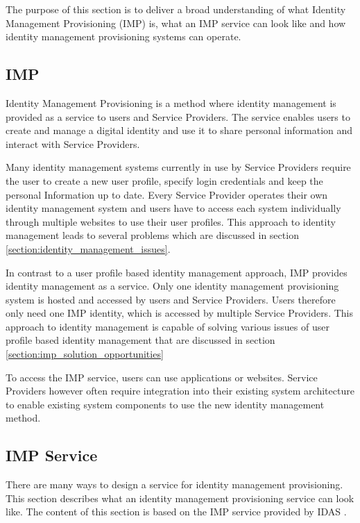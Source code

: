 The purpose of this section is to deliver a broad understanding of what Identity Management Provisioning (IMP) is, what an IMP service can look like and how identity management provisioning systems can operate.

\subsection{IMP}
Identity Management Provisioning is a method where identity management is provided as a service to users and Service Providers. The service enables users to create and manage a digital identity and use it to share personal information and interact with Service Providers.

Many identity management systems currently in use by Service Providers require the user to create a new user profile, specify login credentials and keep the personal Information up to date. Every Service Provider operates their own identity management system and users have to access each system individually through multiple websites to use their user profiles. This approach to identity management leads to several problems which are discussed in section \ref{section:identity_management_issues}.

In contrast to a user profile based identity management approach, IMP provides identity management as a service. Only one identity management provisioning system is hosted and accessed by users and Service Providers. Users therefore only need one IMP identity, which is accessed by multiple Service Providers. This approach to identity management is capable of solving various issues of user profile based identity management that are discussed in section \ref{section:imp_solution_opportunities}

To access the IMP service, users can use applications or websites. Service Providers however often require integration into their existing system architecture to enable existing system components to use the new identity management method.

\subsection{IMP Service}

There are many ways to design a service for identity management provisioning. This section describes what an identity management provisioning service can look like. The content of this section is based on the IMP service provided by IDAS \cite{idas}.

